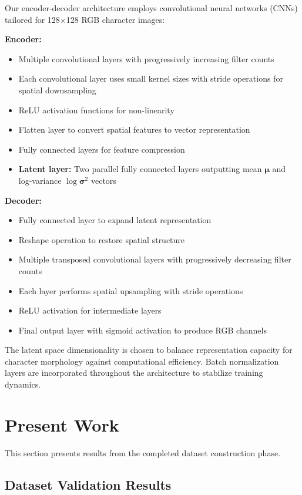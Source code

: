 \documentclass[review]{elsarticle}
\begin{document}
Our encoder-decoder architecture employs convolutional neural networks (CNNs) tailored for 128$\times$128 RGB character images:

\textbf{Encoder:}
\begin{itemize}
\item Multiple convolutional layers with progressively increasing filter counts
\item Each convolutional layer uses small kernel sizes with stride operations for spatial downsampling
\item ReLU activation functions for non-linearity
\item Flatten layer to convert spatial features to vector representation
\item Fully connected layers for feature compression
\item \textbf{Latent layer:} Two parallel fully connected layers outputting mean $\boldsymbol{\mu}$ and log-variance $\log \boldsymbol{\sigma}^2$ vectors
\end{itemize}

\textbf{Decoder:}
\begin{itemize}
\item Fully connected layer to expand latent representation
\item Reshape operation to restore spatial structure
\item Multiple transposed convolutional layers with progressively decreasing filter counts
\item Each layer performs spatial upsampling with stride operations
\item ReLU activation for intermediate layers
\item Final output layer with sigmoid activation to produce RGB channels
\end{itemize}

The latent space dimensionality is chosen to balance representation capacity for character morphology against computational efficiency. Batch normalization layers are incorporated throughout the architecture to stabilize training dynamics.

\section{Present Work}
\label{sec:results}

This section presents results from the completed dataset construction phase.

\subsection{Dataset Validation Results}
\end{document}
